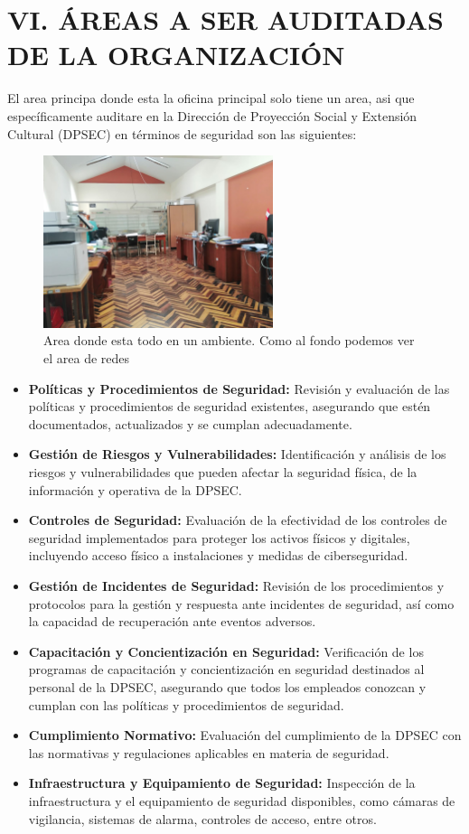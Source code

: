 \documentclass[12pt,a4paper]{article}
\begin{document}
\section{VI. ÁREAS A SER AUDITADAS DE LA ORGANIZACIÓN}
El area principa donde esta la oficina principal solo tiene un area, asi que específicamente auditare en la Dirección de Proyección Social y Extensión Cultural (DPSEC) en términos de seguridad son las siguientes:
\begin{figure}[!htb]
    \centering
    \includegraphics[width=0.6\textwidth]{images/AreaTrabajo.jpeg}
    \caption{Area donde esta todo en un ambiente. Como al fondo podemos ver el area de redes}
    
\end{figure}
\begin{itemize}
    \item \textbf{Políticas y Procedimientos de Seguridad:} Revisión y evaluación de las políticas y procedimientos de seguridad existentes, asegurando que estén documentados, actualizados y se cumplan adecuadamente.
    \item \textbf{Gestión de Riesgos y Vulnerabilidades:} Identificación y análisis de los riesgos y vulnerabilidades que pueden afectar la seguridad física, de la información y operativa de la DPSEC.
    \item \textbf{Controles de Seguridad:} Evaluación de la efectividad de los controles de seguridad implementados para proteger los activos físicos y digitales, incluyendo acceso físico a instalaciones y medidas de ciberseguridad.
    \item \textbf{Gestión de Incidentes de Seguridad:} Revisión de los procedimientos y protocolos para la gestión y respuesta ante incidentes de seguridad, así como la capacidad de recuperación ante eventos adversos.
    \item \textbf{Capacitación y Concientización en Seguridad:} Verificación de los programas de capacitación y concientización en seguridad destinados al personal de la DPSEC, asegurando que todos los empleados conozcan y cumplan con las políticas y procedimientos de seguridad.
    \item \textbf{Cumplimiento Normativo:} Evaluación del cumplimiento de la DPSEC con las normativas y regulaciones aplicables en materia de seguridad.
    \item \textbf{Infraestructura y Equipamiento de Seguridad:} Inspección de la infraestructura y el equipamiento de seguridad disponibles, como cámaras de vigilancia, sistemas de alarma, controles de acceso, entre otros.
    
\end{itemize}
\end{document}
